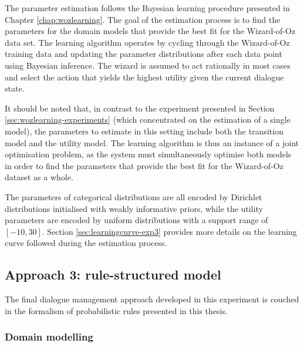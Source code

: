 The parameter estimation follows the Bayesian learning procedure presented in Chapter \ref{chap:wozlearning}. The goal of the estimation process is to find the parameters for the domain models that provide the best fit for the Wizard-of-Oz data set. The learning algorithm operates by cycling through the Wizard-of-Oz training data and updating the parameter distributions after each data point using Bayesian inference. The wizard is assumed to act rationally in most cases and select the action that yields the highest utility given the current dialogue state. 

It should be noted that, in contrast to the experiment presented in Section \ref{sec:wozlearning-experiments} (which concentrated on the estimation of a single model), the parameters to estimate in this setting include both the transition model and the utility model.  The learning algorithm is thus an instance of a joint optimisation problem, as the system must simultaneously optimise both models in order to find the parameters that provide the best fit for the Wizard-of-Oz dataset as a whole. 

The parameters of categorical distributions are all encoded by Dirichlet distributions initialised with weakly informative priors, while the utility parameters are encoded by uniform distributions with a support range of $[-10, 30]$.  Section \ref{sec:learningcurve-exp3} provides more details on the learning curve followed during the estimation process.

\subsection{Approach 3: rule-structured model}

The final dialogue management approach developed in this experiment is couched in the formalism of probabilistic rules presented in this thesis.  


\subsubsection*{Domain modelling}

